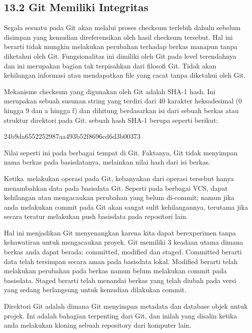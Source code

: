 \subsection*{13.2 Git Memiliki Integritas }
\par
Segala sesuatu pada Git akan melalui proses checksum terlebih dahulu sebelum disimpan yang kemudian direferensikan oleh hasil checksum tersebut. Hal ini berarti tidak mungkin melakukan perubahan terhadap berkas manapun tanpa diketahui oleh Git. Fungsionalitas ini dimiliki oleh Git pada level terendahnya dan ini merupakan bagian tak terpisahkan dari filosofi Git. Tidak akan kehilangan informasi atau mendapatkan file yang cacat tanpa diketahui oleh Git. \par
Mekanisme checksum yang digunakan oleh Git adalah SHA-1 hash. Ini merupakan sebuah susunan string yang terdiri dari 40 karakter heksadesimal (0 hingga 9 dan a hingga f) dan dihitung berdasarkan isi dari sebuah berkas atau struktur direktori pada Git. sebuah hash SHA-1 berupa seperti berikut: \par
\noindent 
24b9da6552252987aa493b52f8696cd6d3b00373 \par
\vspace{12pt}
Nilai seperti ini pada berbagai tempat di Git. Faktanya, Git tidak menyimpan nama berkas pada basisdatanya, melainkan nilai hash dari isi berkas. \par
Ketika~melakukan operasi pada Git, kebanyakan dari operasi tersebut hanya menambahkan data pada basisdata Git. Seperti pada berbagai VCS, dapat kehilangan atau mengacaukan perubahan yang belum di-commit; namun jika anda melakukan commit pada Git akan sangat sulit kehilangannya, terutama jika  secara teratur melakukan push basisdata pada repositori lain. \par
Hal ini menjadikan Git menyenangkan karena kita dapat berexperimen tanpa kehawatiran untuk mengacaukan proyek. Git memiliki 3 keadaan utama dimana berkas anda dapat berada: committed, modified dan staged. Committed berarti data telah tersimpan secara aman pada basisdata lokal. Modified berarti telah melakukan perubahan pada berkas namun belum melakukan commit pada basisdata. Staged berarti telah menandai berkas yang telah diubah pada versi yang sedang berlangsung untuk kemudian dilakukan commit. \par
Direktori Git adalah dimana Git menyimpan metadata dan database objek untuk projek. Ini adalah bahagian terpenting dari Git, dan inilah yang disalin ketika anda melakukan kloning sebuah repository dari komputer lain. \par
